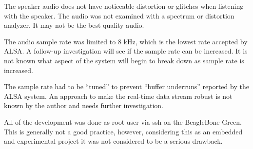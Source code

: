 The speaker audio does not have noticeable distortion or glitches when listening with the speaker.  The audio was not examined with a spectrum or distortion analyzer.  It may not be the best quality audio.

The audio sample rate was limited to 8 kHz, which is the lowest rate accepted by ALSA.  A follow-up investigation will see if the sample rate can be increased.  It is not known what aspect of the system will begin to break down as sample rate is increased.

The sample rate had to be ``tuned'' to prevent ``buffer underruns'' reported by the ALSA system.  An approach to make the real-time data stream robust is not known by the author and needs further investigation.

All of the development was done as root user via ssh on the BeagleBone Green.  This is generally not a good practice, however, considering this as an embedded and experimental project it was not considered to be a serious drawback.


